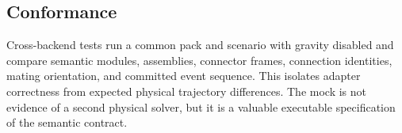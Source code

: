 \subsection{Conformance}

Cross-backend tests run a common pack and scenario with gravity disabled and compare
semantic modules, assemblies, connector frames, connection identities, mating
orientation, and committed event sequence. This isolates adapter correctness from
expected physical trajectory differences. The mock is not evidence of a second
physical solver, but it is a valuable executable specification of the semantic
contract.

